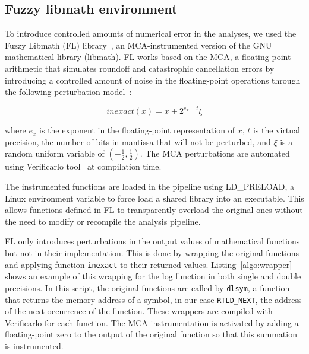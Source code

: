 \subsection{Fuzzy libmath environment}

To introduce controlled amounts of numerical error in the analyses, we used the Fuzzy Libmath (FL) library~\cite{salari2021accurate}, an MCA-instrumented 
version of the GNU mathematical library (libmath).
FL works based on the MCA, a floating-point arithmetic that simulates roundoff and catastrophic cancellation errors
by introducing a controlled amount of noise in the floating-point operations 
through the following perturbation model~\cite{Parker1997-qq}:

\begin{equation} \label{eq:mca_inexact}
  inexact(x) = x + 2^{e_x-t}\xi
\end{equation}

where $e_x$ is the exponent in the floating-point representation of $x$,
$t$ is the virtual precision, the number of bits in mantissa that will not be perturbed,
and $\xi$ is a random uniform variable of $(-\frac{1}{2}, \frac{1}{2})$.
The MCA perturbations are automated using Verificarlo tool~\cite{denis2015verificarlo} at compilation time.

The instrumented functions are loaded in the pipeline using LD\_PRELOAD, a Linux environment variable
to force load a shared library into an executable. This allows functions defined in FL to transparently
overload the original ones without the need to modify or recompile the analysis pipeline.

FL only introduces perturbations in the output values of mathematical
functions but not in their implementation. This is done by wrapping the original functions 
and applying function \texttt{inexact} to their returned values.
Listing~\ref{algo:wrapper} shows an example of this wrapping for the log function in both single and double precisions.
In this script, the original functions are called by \texttt{dlsym},
a function that returns the memory address of a symbol, in our case \texttt{RTLD\_NEXT}, the address of the next occurrence of the function.
These wrappers are compiled with Verificarlo for each function. The MCA
instrumentation is activated by adding a floating-point zero to the output
of the original function so that this summation is instrumented.



